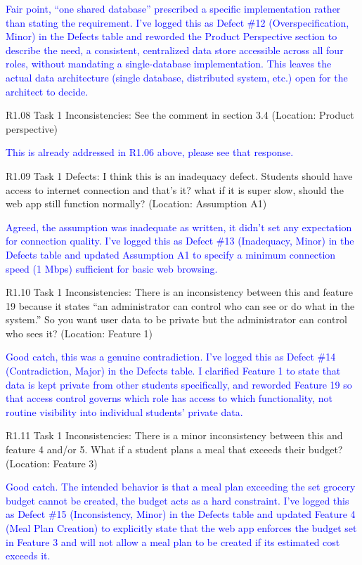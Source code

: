 \documentclass[10pt,letterpaper]{article}
\begin{document}
\textcolor{blue}{Fair point, ``one shared database'' prescribed a specific implementation rather than stating the requirement. I've logged this as Defect \#12 (Overspecification, Minor) in the Defects table and reworded the Product Perspective section to describe the need, a consistent, centralized data store accessible across all four roles, without mandating a single-database implementation. This leaves the actual data architecture (single database, distributed system, etc.) open for the architect to decide.}

R1.08 Task 1 Inconsistencies: See the comment in section 3.4 (Location: Product perspective)

\textcolor{blue}{This is already addressed in R1.06 above, please see that response.}

R1.09 Task 1 Defects: I think this is an inadequacy defect. Students should have access to internet connection and that's it? what if it is super slow, should the web app still function normally? (Location: Assumption A1)

\textcolor{blue}{Agreed, the assumption was inadequate as written, it didn't set any expectation for connection quality. I've logged this as Defect \#13 (Inadequacy, Minor) in the Defects table and updated Assumption A1 to specify a minimum connection speed (1 Mbps) sufficient for basic web browsing.}

R1.10 Task 1 Inconsistencies: There is an inconsistency between this and feature 19 because it states ``an administrator can control who can see or do what in the system.'' So you want user data to be private but the administrator can control who sees it? (Location: Feature 1)

\textcolor{blue}{Good catch, this was a genuine contradiction. I've logged this as Defect \#14 (Contradiction, Major) in the Defects table. I clarified Feature 1 to state that data is kept private from other students specifically, and reworded Feature 19 so that access control governs which role has access to which functionality, not routine visibility into individual students' private data.}

R1.11 Task 1 Inconsistencies: There is a minor inconsistency between this and feature 4 and/or 5. What if a student plans a meal that exceeds their budget? (Location: Feature 3)

\textcolor{blue}{Good catch. The intended behavior is that a meal plan exceeding the set grocery budget cannot be created, the budget acts as a hard constraint. I've logged this as Defect \#15 (Inconsistency, Minor) in the Defects table and updated Feature 4 (Meal Plan Creation) to explicitly state that the web app enforces the budget set in Feature 3 and will not allow a meal plan to be created if its estimated cost exceeds it.}
\end{document}
